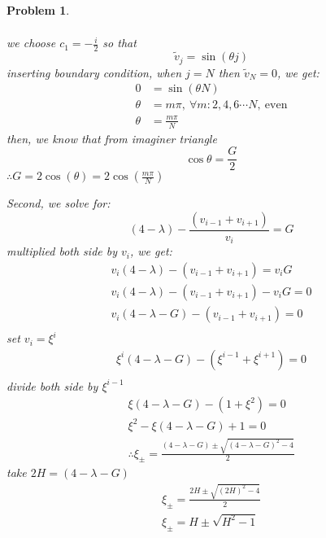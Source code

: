 \documentclass[a4paper,12pt]{article}
\newtheorem{prob}{Problem}[]
\begin{document}
\begin{prob}
\begin{enumerate}[label=(\alph*)]
\begin{equation*}
\begin{aligned}
		\end{aligned}
		\end{equation*}
		we choose $c_1 = -\frac{i}{2}$ so that $$\tilde{v}_j = \sin(\theta j)$$
		inserting boundary condition, when $j=N$ then $\tilde{v}_N=0$, we get:
		\begin{equation*}
		\begin{aligned}
		0 &= \sin(\theta N)\\
		\theta &= m\pi,\ \forall m:2,4,6\cdots N,\ \text{even}\\
		\theta &= \frac{m\pi}{N}
		\end{aligned}
		\end{equation*}
		then, we know that from imaginer triangle $$\cos \theta = \frac{G}{2}$$
		$\therefore G = 2 \cos(\theta) = 2 \cos(\frac{m\pi}{N})$
		
		Second, we solve for:
		$$(4-\lambda) -\frac{(v_{i-1} + v_{i+1})}{v_i} = G$$
		multiplied both side by $v_i$, we get:
		\begin{equation*}
		\begin{aligned}
		v_i(4-\lambda) -(v_{i-1} + v_{i+1}) = v_i G\\
		v_i(4-\lambda) -(v_{i-1} + v_{i+1}) - v_i G = 0\\
		v_i(4-\lambda - G) -(v_{i-1} + v_{i+1}) = 0\\
		\end{aligned}
		\end{equation*}
		set $v_i = \xi^i$
		\begin{equation*}
		\begin{aligned}
		\xi^i(4-\lambda - G) -(\xi^{i-1} + \xi^{i+1}) = 0\\
		\end{aligned}
		\end{equation*}
		divide both side by $\xi^{i-1}$
		\begin{equation*}
		\begin{aligned}
		\xi(4-\lambda - G) -(1 + \xi^2) = 0\\
		\xi^2 - \xi(4-\lambda - G) + 1 = 0\\
		\therefore \xi_\pm = \frac{(4-\lambda - G) \pm \sqrt{(4-\lambda - G)^2 - 4}}{2}
		\end{aligned}
		\end{equation*}
		take $2H = (4-\lambda - G)$
		\begin{equation}\label{eq:14}
		\begin{aligned}
		\xi_\pm = \frac{2H \pm \sqrt{(2H)^2 - 4}}{2}\\
		\xi_\pm = H \pm \sqrt{H^2 - 1}

\end{aligned}
\end{equation}
\end{enumerate}
\end{prob}
\end{document}
